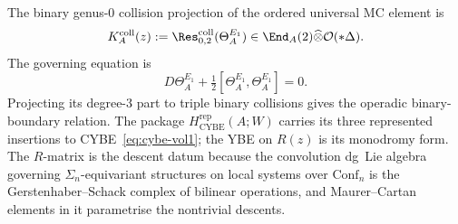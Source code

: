 \begin{remark}
\label{rem:r-matrix-mc-vol1}
The binary genus-$0$ collision projection of the ordered universal MC
element is
\[
K_A^{\mathrm{coll}}(z)
:=\Res^{\mathrm{coll}}_{0,2}(\Theta_A^{E_1})
\in\End_A(2)\widehat\otimes\mathcal O(*\Delta).
\]
The governing equation is
\[
D\Theta_A^{E_1}
+\tfrac{1}{2}[\Theta_A^{E_1},\Theta_A^{E_1}]=0.
\]
Projecting its degree-$3$ part to triple binary collisions gives the
operadic binary-boundary relation.  The package
$H_{\mathrm{CYBE}}^{\mathrm{rep}}(A;W)$ carries its three represented
insertions to CYBE~\eqref{eq:cybe-vol1}; the YBE on $R(z)$ is its
monodromy form. The $R$-matrix is
the descent datum because the convolution dg~Lie algebra governing
$\Sigma_n$-equivariant structures on local systems over
$\mathrm{Conf}_n$ is the Gerstenhaber--Schack complex of bilinear
operations, and Maurer--Cartan elements in it parametrise the
nontrivial descents.
\end{remark}

